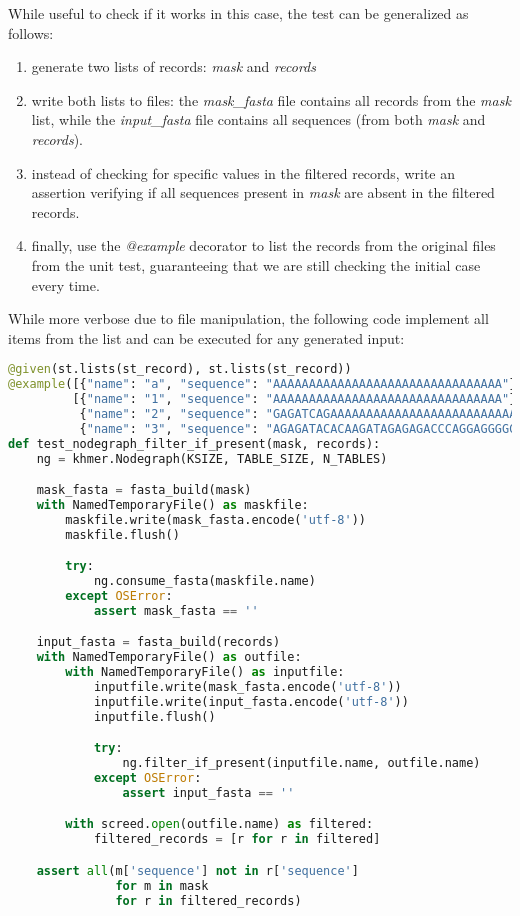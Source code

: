 \documentclass[preprint,nocopyrightspace]{sig-alternate}
\begin{document}
While useful to check if it works in this case,
the test can be generalized as follows:

\begin{enumerate}
\item generate two lists of records: \emph{mask} and \emph{records}
\item write both lists to files: the \emph{mask\_fasta} file contains all records from the \emph{mask} list,
while the \emph{input\_fasta} file contains all sequences (from both \emph{mask} and \emph{records}).
\item instead of checking for specific values in the filtered records,
write an assertion verifying if all sequences present in \emph{mask} are absent in the filtered records.
\item finally, use the \emph{@example} decorator to list the records from the original files from the unit test,
guaranteeing that we are still checking the initial case every time.
\end{enumerate}

While more verbose due to file manipulation,
the following code implement all items from the list and can be executed for any generated input:

\begin{lstlisting}[language=Python,basicstyle=\tiny\tt,caption={filter\_if\_present Hypothesis test},label={FilterHypothesis}]
@given(st.lists(st_record), st.lists(st_record))
@example([{"name": "a", "sequence": "AAAAAAAAAAAAAAAAAAAAAAAAAAAAAAAA"}],
         [{"name": "1", "sequence": "AAAAAAAAAAAAAAAAAAAAAAAAAAAAAAAA"},
          {"name": "2", "sequence": "GAGATCAGAAAAAAAAAAAAAAAAAAAAAAAAAAAAAAAAA"},
          {"name": "3", "sequence": "AGAGATACACAAGATAGAGAGACCCAGGAGGGGG"}])
def test_nodegraph_filter_if_present(mask, records):
    ng = khmer.Nodegraph(KSIZE, TABLE_SIZE, N_TABLES)

    mask_fasta = fasta_build(mask)
    with NamedTemporaryFile() as maskfile:
        maskfile.write(mask_fasta.encode('utf-8'))
        maskfile.flush()

        try:
            ng.consume_fasta(maskfile.name)
        except OSError:
            assert mask_fasta == ''

    input_fasta = fasta_build(records)
    with NamedTemporaryFile() as outfile:
        with NamedTemporaryFile() as inputfile:
            inputfile.write(mask_fasta.encode('utf-8'))
            inputfile.write(input_fasta.encode('utf-8'))
            inputfile.flush()

            try:
                ng.filter_if_present(inputfile.name, outfile.name)
            except OSError:
                assert input_fasta == ''

        with screed.open(outfile.name) as filtered:
            filtered_records = [r for r in filtered]

    assert all(m['sequence'] not in r['sequence']
               for m in mask
               for r in filtered_records)

\end{lstlisting}
\end{document}
